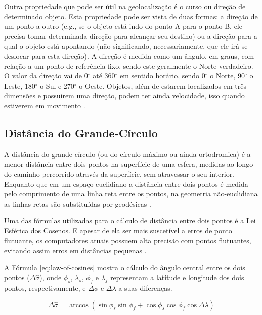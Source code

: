 \documentclass[diss]{template/setrem}
\begin{document}
Outra propriedade que pode ser útil na geolocalização é o curso ou direção de determinado objeto. Esta propriedade pode ser vista de duas formas: a direção de um ponto a outro (e.g., se o objeto está indo do ponto A para o ponto B, ele precisa tomar determinada direção para alcançar seu destino) ou a direção para a qual o objeto está apontando (não significando, necessariamente, que ele irá se deslocar para esta direção). A direção é medida como um ângulo, em graus, com relação a um ponto de referência fixo, sendo este geralmente o Norte verdadeiro. O valor da direção vai de 0$^{\circ}$ até 360$^{\circ}$ em sentido horário, sendo 0$^{\circ}$ o Norte, 90$^{\circ}$ o Leste, 180$^{\circ}$ o Sul e 270$^{\circ}$ o Oeste. Objetos, além de estarem localizados em três dimensões e possuirem uma direção, podem ter ainda velocidade, isso quando estiverem em movimento \citep{Holdener2011}.

\subsection{Distância do Grande-Círculo}
A distância do grande círculo (ou do círculo máximo ou ainda ortodromica) é a menor distância entre dois pontos na superfície de uma esfera, medidas ao longo do caminho percorrido através da superfície, sem atravessar o seu interior. Enquanto que em um espaço euclidiano a distância entre dois pontos é medida pelo comprimento de uma linha reta entre os pontos, na geometria não-euclidiana as linhas retas são substituídas por geodésicas \citep{Weisstein2012}.

Uma das fórmulas utilizadas para o cálculo de distância entre dois pontos é a Lei Esférica dos Cosenos. E apesar de ela ser mais suscetível a erros de ponto flutuante, os computadores atuais possuem alta precisão com pontos flutuantes, evitando assim erros em distâncias pequenas \citep{MovableType2012}.

A Fórmula \ref{eq:law-of-cosines} mostra o cálculo do ângulo central entre os dois pontos ($\Delta \hat{\sigma }$), onde $\phi _{s}$, $\lambda _{s}$, $\phi _{f}$ e $\lambda _{f}$ representam a latitude e longitude dos dois pontos, respectivamente, e $\Delta \phi$ e $\Delta \lambda$ a suas diferenças.

\begin{equation}
\label{eq:law-of-cosines}
\Delta \hat{\sigma } = \arccos \left ( \sin \phi _{s} \sin \phi _{f} + \cos \phi _{s} \cos \phi _{f} \cos \Delta \lambda \right )
\end{equation}
\end{document}
